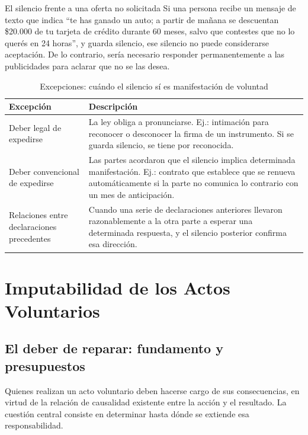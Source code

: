 \documentclass[12pt,oneside]{book}
\begin{document}
\begin{example}{El silencio frente a una oferta no solicitada}
Si una persona recibe un mensaje de texto que indica ``te has ganado un auto; a partir de mañana se descuentan \$20.000 de tu tarjeta de crédito durante 60 meses, salvo que contestes que no lo querés en 24 horas'', y guarda silencio, ese silencio no puede considerarse aceptación. De lo contrario, sería necesario responder permanentemente a las publicidades para aclarar que no se las desea.
\end{example}

\begin{table}[H]
\centering
\caption{Excepciones: cuándo el silencio sí es manifestación de voluntad}
\begin{tabularx}{\textwidth}{l X}
\toprule
\textbf{Excepción} & \textbf{Descripción} \\
\midrule
Deber legal de expedirse & La ley obliga a pronunciarse. Ej.: intimación para reconocer o desconocer la firma de un instrumento. Si se guarda silencio, se tiene por reconocida. \\
Deber convencional de expedirse & Las partes acordaron que el silencio implica determinada manifestación. Ej.: contrato que establece que se renueva automáticamente si la parte no comunica lo contrario con un mes de anticipación. \\
Relaciones entre declaraciones precedentes & Cuando una serie de declaraciones anteriores llevaron razonablemente a la otra parte a esperar una determinada respuesta, y el silencio posterior confirma esa dirección. \\
\bottomrule
\end{tabularx}
\end{table}

\chapter{Imputabilidad de los Actos Voluntarios}

\section{El deber de reparar: fundamento y presupuestos}

Quienes realizan un acto voluntario deben hacerse cargo de sus consecuencias, en virtud de la relación de causalidad existente entre la acción y el resultado. La cuestión central consiste en determinar hasta dónde se extiende esa responsabilidad.
\end{document}

